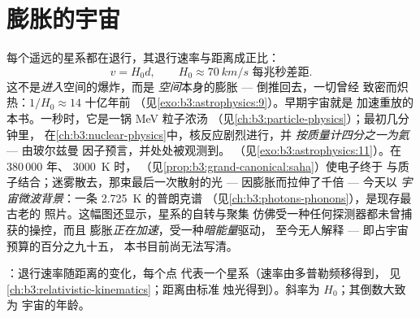 \section{膨胀的宇宙}

\begin{definition}[哈勃定律与炽热的开端]\label{def:b3:astrophysics:hubble}
每个遥远的星系都在退行，其退行速率与距离成正比：
\[
v = H_0d , \qquad H_0 \approx \qty{70}{km/s}
\text{ 每兆秒差距} .
\]
这不是\emph{进入}空间的爆炸，而是
\emph{空间}本身的膨胀 --- 倒推回去，一切曾经
致密而炽热：$1/H_0 \approx 14$ 十亿年前
（见\cref{exo:b3:astrophysics:9}）。早期宇宙就是
加速重放的本书。一秒时，它是一锅 \unit{MeV} 粒子浓汤
（见\cref{ch:b3:particle-physics}）；最初几分钟里，
在\cref{ch:b3:nuclear-physics}中，核反应剧烈进行，并
\emph{按质量计四分之一为氦} --- 由玻尔兹曼
因子预言，并处处被观测到。
（见\cref{exo:b3:astrophysics:11}）。在 380\,000 年、
\qty{3000}{K} 时，
（见\cref{prop:b3:grand-canonical:saha}）使电子终于
与质子结合；迷雾散去，那束最后一次散射的光 ---
因膨胀而拉伸了千倍 --- 今天以
\emph{宇宙微波背景}：一条 \qty{2.725}{K} 的普朗克谱
（见\cref{ch:b3:photons-phonons}），是现存最古老的
照片。这幅图还显示，星系的自转与聚集
仿佛受一种任何探测器都未曾捕获的\emph{}操控，而且
膨胀\emph{正在加速}，受一种\emph{暗能量}驱动，
至今无人解释 --- 即占宇宙预算的百分之九十五，
本书目前尚无法写清。
\end{definition}

\begin{omfigure}

{\small {}：退行速率随距离的变化，每个点
代表一个星系（速率由多普勒频移得到，
见\cref{ch:b3:relativistic-kinematics}；距离由标准
烛光得到）。斜率为 $H_0$；其倒数大致为
宇宙的年龄。}
\end{omfigure}

